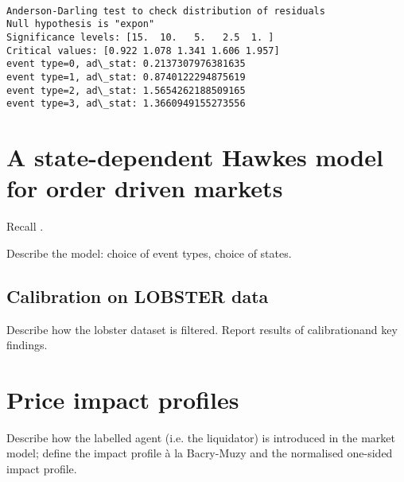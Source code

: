 \documentclass[10pt]{article}
\begin{document}
    \begin{center}
    \end{center}
    { \hspace*{\fill} \\}
    
    \begin{Verbatim}[commandchars=\\\{\}, fontsize=\small]
Anderson-Darling test to check distribution of residuals
Null hypothesis is "expon"
Significance levels: [15.  10.   5.   2.5  1. ]
Critical values: [0.922 1.078 1.341 1.606 1.957]
event type=0, ad\_stat: 0.2137307976381635
event type=1, ad\_stat: 0.8740122294875619
event type=2, ad\_stat: 1.5654262188509165
event type=3, ad\_stat: 1.3660949155273556
    \end{Verbatim}


\section{A state-dependent Hawkes model for order driven markets}
Recall \cite{BM14haw}.

Describe the model: choice of event types, choice of states. 

\subsection{Calibration on LOBSTER data}
Describe how the lobster dataset is filtered. Report results of calibrationand key findings. 


\section{Price impact profiles}
Describe how the labelled agent (i.e. the liquidator) is introduced in the market model; define the impact profile \`a la Bacry-Muzy and the normalised one-sided impact profile.  

    


    
\end{document}

